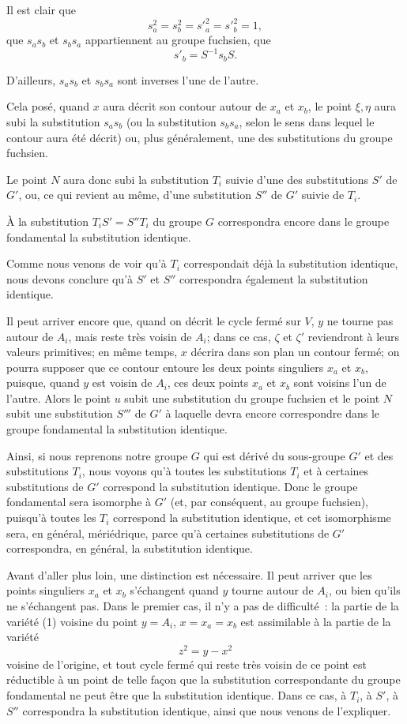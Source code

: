 \documentclass{article}
\begin{document}
Il est clair que
\[ s^{2}_{a} = s^{2}_{b} = s'^{2}_{a} = s'^{2}_{b} = 1, \]
que $s_{a}s_{b}$ et $s_{b}s_{a}$ appartiennent au groupe fuchsien, que
\[ s'_{b} = S^{-1} s_{b} S. \]

D'ailleurs, $s_{a}s_{b}$ et $s_{b}s_{a}$ sont inverses l'une de l'autre.

Cela posé, quand $x$ aura décrit son contour autour de $x_{a}$ et $x_{b}$, le point $\xi, \eta$ aura subi la substitution $s_{a}s_{b}$ (ou la substitution $s_{b}s_{a}$, selon le sens dans lequel le contour aura été décrit) ou, plus généralement, une des substitutions du groupe fuchsien.

Le point $N$ aura donc subi la substitution $T_{i}$ suivie d'une des
substitutions $S'$ de $G'$, ou, ce qui revient au même, d'une substitution $S''$ de $G'$ suivie de $T_{i}$.

À la substitution $T_{i}S' = S''T_{i}$ du groupe $G$ correspondra encore dans le groupe fondamental la substitution identique.

Comme nous venons de voir qu'à $T_{i}$ correspondait déjà la substitution identique, nous devons conclure qu'à $S'$ et $S''$ correspondra également la substitution identique.

Il peut arriver encore que, quand on décrit le cycle fermé sur $V$, $y$ ne tourne pas autour de $A_{i}$, mais reste très voisin de $A_{i}$; dans ce cas, $\zeta$ et $\zeta'$ reviendront à leurs valeurs primitives; en même temps, $x$ décrira dans son plan un contour fermé; on pourra supposer que ce contour entoure les deux points singuliers $x_{a}$ et $x_{b}$, puisque, quand $y$ est voisin de $A_{i}$, ces deux points $x_{a}$ et $x_{b}$ sont voisins l'un de l'autre. Alors le point $u$ subit une substitution du groupe fuchsien et le point $N$ subit une substitution $S'''$ de $G'$ à laquelle devra encore correspondre dans le groupe fondamental la substitution identique.

Ainsi, si nous reprenons notre groupe $G$ qui est dérivé du sous-groupe $G'$ et des substitutions $T_{i}$, nous voyons qu'à toutes les substitutions $T_{i}$ et à certaines substitutions de $G'$ correspond la substitution identique. Donc le groupe fondamental sera isomorphe à $G'$ (et, par conséquent, au groupe fuchsien), puisqu'à toutes les $T_{i}$ correspond la substitution identique, et cet isomorphisme sera, en général, mériédrique, parce qu'à certaines substitutions de $G'$ correspondra, en général, la substitution identique.

Avant d'aller plus loin, une distinction est nécessaire. Il peut arriver que les points singuliers $x_{a}$ et $x_{b}$ s'échangent quand $y$ tourne autour de $A_{i}$, ou bien qu'ils ne s'échangent pas. Dans le premier cas, il n'y a pas de difficulté~: la partie de la variété (1) voisine du point $y = A_{i}$, $x = x_{a} = x_{b}$ est assimilable à la partie de la variété
\[ z^{2} = y - x^{2} \]
voisine de l'origine, et tout cycle fermé qui reste très voisin de ce point est réductible à un point de telle façon que la substitution correspondante du groupe fondamental ne peut être que la substitution identique. Dans ce cas, à $T_{i}$, à $S'$, à $S''$ correspondra la substitution identique, ainsi que nous venons de l'expliquer.
\end{document}
